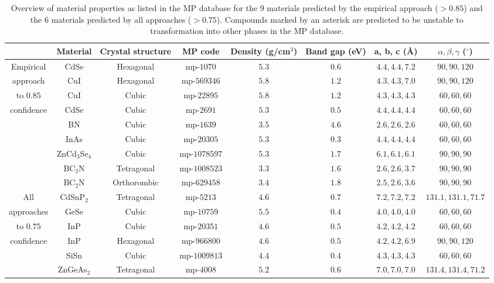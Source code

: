 \documentclass[superscriptaddress,unsortedaddress,
 amsmath,amssymb,
 aps,
]{revtex4-2}
\begin{document}
\begin{table}[t]
    \centering 
    \caption{Overview of material properties as listed in the MP database for the $9$ materials predicted by the empirical approach ($>0.85$) and the $6$ materials predicted by all approaches ($>0.75$). Compounds marked by an asterisk are predicted to be unstable to transformation into other phases in the MP database. }
    \begin{tabular}{c|c c c c c c c }
      & Material & Crystal structure & MP code & Density (g/cm$^3$) & Band gap (eV) & a, b, c (\AA) & $\alpha,\beta,\gamma$ ($^\circ$) \\
    \hline 
    Empirical & CdSe & Hexagonal & mp-$1070$ & $5.3$ & $0.6$ & $4.4,4.4,7.2$ & $90,90,120$ \\
    approach  & CuI & Hexagonal & mp-$569346$ & $5.8$ & $1.2$ & $4.3,4.3,7.0$ & $90,90,120$ \\ 
    to $0.85$  & CuI & Cubic & mp-$22895$ & $5.8$ & $1.2$ & $4.3,4.3,4.3$ & $60,60,60$  \\ 
    confidence & CdSe & Cubic & mp-$2691$ & $5.3$ & $0.5$ & $4.4,4.4,4.4$ & $60,60,60$  \\
     & BN & Cubic & mp-$1639$ & $3.5$ & $4.6$ & $2.6,2.6,2.6$ & $60,60,60$  \\
     & InAs & Cubic & mp-$20305$ & $5.3$ & $0.3$ & $4.4,4.4,4.4$ & $60,60,60$ \\
     & ZnCd$_3$Se$_4$ & Cubic & mp-$1078597$ & $5.3$ & $1.7$ & $6.1,6.1,6.1$ & $90,90,90$ \\
     & BC$_2$N & Tetragonal & mp-$1008523$ & $3.3$ & $1.6$ & $2.6,2.6,3.7$ & $90,90,90$ \\
     & BC$_2$N & Orthorombic & mp-$629458$ & $3.4$ & $1.8$ & $2.5,2.6,3.6$ & $90,90,90$ \\
    \hline 
    All & CdSnP$_2$ & Tetragonal & mp-$5213$ & $4.6$ & $0.7$ & $7.2,7.2,7.2$ & $131.1,131.1,71.7$ \\
    approaches & GeSe & Cubic & mp-$10759$ & $5.5$ & $0.4$ & $4.0,4.0,4.0$ & $60,60,60$ \\
    to $0.75$  & InP & Cubic & mp-$20351$ & $4.6$ & $0.5$ & $4.2,4.2,4.2$ &  $60,60,60$\\ 
    confidence & InP & Hexagonal & mp-$966800$ & $4.6$ & $0.5$ & $4.2,4.2,6.9$ & $90,90,120$ \\ 
     & SiSn & Cubic & mp-$1009813$ & $4.4$ & $0.4$ & $4.3,4.3,4.3$ & $60,60,60$ \\
     & ZnGeAs$_2$ & Tetragonal & mp-$4008$ & $5.2$ & $0.6$ & $7.0,7.0,7.0$ & $131.4,131.4,71.2$ \\
    \end{tabular}
    \label{tab:materialproperties}
\end{table}
\end{document}
